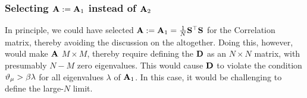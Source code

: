 \subsubsection{Selecting $\mathbf{A}:=\mathbf{A}_{1}$ instead of $\mathbf{A}_{2}$}
\label{sxn:tanaka_end}
In principle, we could have selected $\mathbf{A}:=\mathbf{A}_{1}=\tfrac{1}{N}{\mathbf{S}}^{\top}{\mathbf{S}}$  for the \Student Correlation matrix,
thereby avoiding the discussion on the \DualityOfMeasures altogether.
Doing this, however, would make $\mathbf{A}$ $M\times M$, thereby
require defining the \SourceMatrix $\mathbf{D}$ as an
$N \times N$ matrix, with presumably $N-M$ zero eigenvalues.
This would cause $\mathbf{D}$ to violate the condition $\vartheta_{\mu} > \beta\lambda$
for all eigenvalues $\lambda$ of $\mathbf{A}_{1}$.
In this case, it would be challenging to define the large-$N$ limit.


